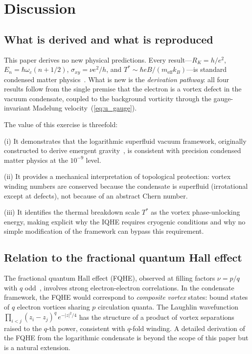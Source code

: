 \documentclass[12pt, a4paper]{article}
\newcommand{\meff}{m_{\mathrm{eff}}}
\begin{document}
\section{Discussion}
\label{sec:discussion}

\subsection{What is derived and what is reproduced}

This paper derives no new physical predictions. Every
result---$R_K = h/e^2$, $E_n = \hbar\omega_c(n+1/2)$,
$\sigma_{xy} = \nu e^2/h$, and
$T^* \sim \hbar eB/(\meff k_B)$---is standard
condensed matter physics~\cite{klitzing_1980,
thouless_1982}. What is new is the \emph{derivation
pathway}: all four results follow from the single
premise that the electron is a vortex defect in the
vacuum condensate, coupled to the background
vorticity through the gauge-invariant Madelung
velocity~(\ref{eq:u_gauge}).

The value of this exercise is threefold:

(i) It demonstrates that the logarithmic superfluid
vacuum framework, originally constructed to derive
emergent gravity~\cite{kulangiev_gravity,
kulangiev_geff}, is consistent with precision
condensed matter physics at the $10^{-9}$ level.

(ii) It provides a mechanical interpretation of
topological protection: vortex winding numbers are
conserved because the condensate is superfluid
(irrotational except at defects), not because of an
abstract Chern number.

(iii) It identifies the thermal breakdown scale
$T^*$ as the vortex phase-unlocking energy, making
explicit why the IQHE requires cryogenic conditions
and why no simple modification of the framework can
bypass this requirement.

\subsection{Relation to the fractional quantum Hall
effect}

The fractional quantum Hall effect (FQHE), observed
at filling factors $\nu = p/q$ with $q$
odd~\cite{laughlin_1983}, involves strong
electron-electron correlations. In the condensate
framework, the FQHE would correspond to
\emph{composite vortex} states: bound states of
$q$ electron vortices sharing $p$ circulation
quanta. The Laughlin wavefunction
$\prod_{i<j}(z_i - z_j)^q\,e^{-|z|^2/4}$ has the
structure of a product of vortex separations raised
to the $q$-th power, consistent with $q$-fold
winding. A detailed derivation of the FQHE from the
logarithmic condensate is beyond the scope of this
paper but is a natural extension.
\end{document}

